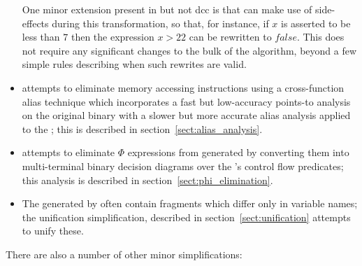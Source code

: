 \begin{itemize}
  One minor extension present in {\implementation} but not dcc is that
  {\implementation} can make use of  side-effects during
  this transformation, so that, for instance, if $x$ is asserted to be
  less than $7$ then the expression $x > 22$ can be rewritten to
  $false$.  This does not require any significant changes to the bulk
  of the algorithm, beyond a few simple rules describing when such
  rewrites are valid.  
\item
  {\Technique} attempts to eliminate memory accessing instructions
  using a cross-function alias technique which incorporates a fast but
  low-accuracy points-to analysis on the original binary with a slower
  but more accurate alias analysis applied to the {\StateMachine};
  this is described in section~\ref{sect:alias_analysis}.
\item
  {\Technique} attempts to eliminate $\Phi$ expressions from generated
  {\StateMachines} by converting them into multi-terminal binary
  decision diagrams over the {\StateMachine}'s control flow predicates;
  this analysis is described in section~\ref{sect:phi_elimination}.
\item
  The {\StateMachines} generated by {\technique} often contain
  fragments which differ only in variable names; the unification
  simplification, described in section~\ref{sect:unification} attempts
  to unify these.
\end{itemize}

There are also a number of other minor simplifications:

